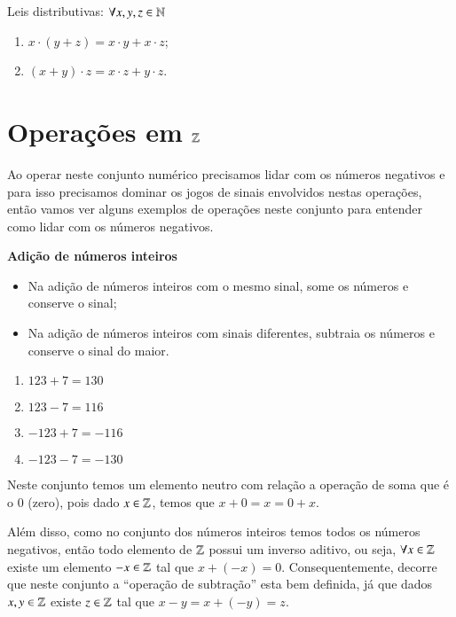  Leis distributivas: $\forall x, y, z \in \mathbb{N}$
 \begin{enumerate}[1)]
 \item $x \cdot (y + z)= x \cdot y + x \cdot z$;
 \item $(x + y) \cdot z= x \cdot z + y \cdot z$.
 \end{enumerate}

 \section{Operações em \texorpdfstring{$\mathbb{Z}$}{Z}}

 Ao operar neste conjunto numérico precisamos lidar com os números negativos e para isso precisamos dominar os jogos de sinais envolvidos nestas operações, então vamos ver alguns exemplos de operações neste conjunto para entender como lidar com os números negativos.

   \vskip0.3cm
   
 \textbf{Adição de números inteiros}

 \begin{itemize}
  \item Na adição de números inteiros com o mesmo sinal, some os números e conserve o sinal;
  \item Na adição de números inteiros com sinais diferentes, subtraia os números e conserve o sinal do maior.
 \end{itemize}

  \begin{enumerate}[1)]
   \item $123 + 7= 130$
   \item $123 - 7= 116$
   \item $-123 + 7 = -116$
   \item $-123 - 7 = -130$
 \end{enumerate}
 
  Neste conjunto temos um elemento neutro com relação a operação de soma que é o $0$ (zero), pois dado $x \in \mathbb{Z}$, temos que $x+0=x=0+x$.
 
 Além disso, como no conjunto dos números inteiros temos todos os números negativos, então todo elemento de $\mathbb{Z}$ possui um inverso aditivo, ou seja, $\forall x \in \mathbb{Z}$ existe um elemento $-x \in \mathbb{Z}$ tal que $x + (-x)=0$. Consequentemente, decorre que neste conjunto a ``operação de subtração'' esta bem definida, já que dados $x, y \in \mathbb{Z}$ existe $z \in \mathbb{Z}$ tal que $x - y= x+ (-y)= z$.

   \vskip0.3cm
  
